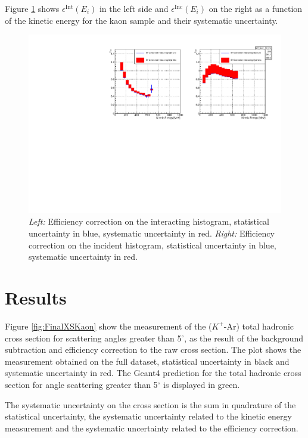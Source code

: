 Figure \ref{fig:EffCorrK} shows $\epsilon^{\text{Int}}(E_{i})$ in the left side and $ \epsilon^{\text{Inc}}(E_i)$ on the right as a function of the kinetic energy for the kaon sample and their systematic uncertainty. 


\begin{figure}
\centering
\includegraphics[width=\textwidth]{Chapter-7/Images/EffCorrK.pdf}
\caption{\emph{Left:} Efficiency correction on the interacting histogram, statistical uncertainty in blue, systematic uncertainty in red. \emph{Right:}  Efficiency correction on the incident histogram, statistical uncertainty in blue, systematic uncertainty in red.}
\label{fig:EffCorrK}
\end{figure}



\section{Results}\label{ch:FinalKaon}
Figure \ref{fig:FinalXSKaon} show the measurement of the ($K^+$-Ar) total hadronic cross section for  scattering angles greater than 5$^\circ$, as the result of the background subtraction and efficiency correction to the raw cross section. The plot shows the measurement obtained on the full dataset, statistical uncertainty in black and systematic uncertainty in red. The Geant4 prediction for the total hadronic cross section for angle scattering greater than 5$^\circ$ is displayed in green.

The systematic uncertainty on the cross section is the sum in quadrature of the statistical uncertainty, the systematic uncertainty related to the kinetic energy measurement and the systematic uncertainty related to the efficiency correction.

